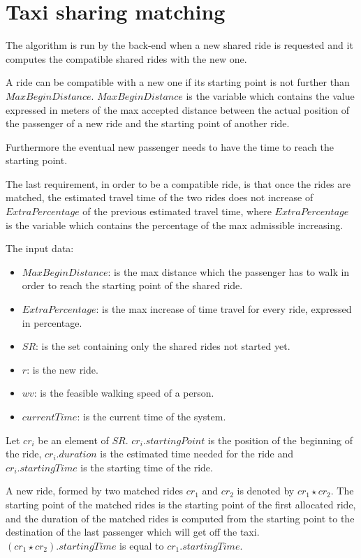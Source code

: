 \section{Taxi sharing matching}
The algorithm is run by the back-end when a new shared ride is requested and it computes the compatible shared rides with the new one.

A ride can be compatible with a new one if its starting point is not further than $MaxBeginDistance$. $MaxBeginDistance$ is the variable which contains the value expressed in meters of the max accepted distance between the actual position of the passenger of a new ride and the starting point of another ride.

Furthermore the eventual new passenger needs to have the time to reach the starting point.

The last requirement, in order to be a compatible ride, is that once the rides are matched, the estimated travel time of the two rides does not increase of $ExtraPercentage$ of the previous estimated travel time, where $ExtraPercentage$ is the variable which contains the percentage of the max admissible increasing.

The input data:
\begin{itemize}
	\item $MaxBeginDistance$: is the max distance which the passenger has to walk in order to reach the starting point of the shared ride.
	\item $ExtraPercentage$: is the max increase of time travel for every ride, expressed in percentage.
	\item $SR$: is the set containing only the shared rides not started yet.
	\item $r$: is the new ride.
	\item $wv$: is the feasible walking speed of a person.
	\item $currentTime$: is the current time of the system.
\end{itemize}

Let $cr_i$ be an element of $SR$. $cr_i.startingPoint$ is the position of the beginning of the ride, $cr_i.duration$ is the estimated time needed for the ride and $cr_i.startingTime$ is the starting time of the ride.

A new ride, formed by two matched rides $cr_1$ and $cr_2$ is denoted by $ cr_1 \star cr_2 $. The starting point of the matched rides is the starting point of the first allocated ride, and the duration of the matched rides is computed from the starting point to the destination of the last passenger which will get off the taxi. $ (cr_1 \star cr_2).startingTime $ is equal to $cr_1.startingTime$.

